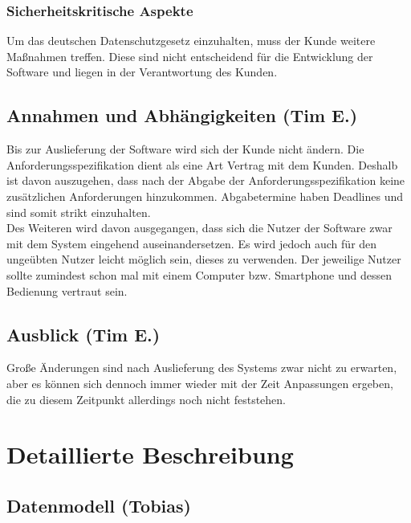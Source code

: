 \documentclass[fontsize=12pt,paper=a4,twoside]{scrartcl}
\begin{document}
\subsubsection{Sicherheitskritische Aspekte} \label{subsubsec:SicherheitsAspekte} Um das deutschen Datenschutzgesetz einzuhalten, muss der Kunde weitere Maßnahmen treffen. Diese sind nicht entscheidend für die Entwicklung der Software und liegen in der Verantwortung des Kunden.

\subsection{Annahmen und Abhängigkeiten (Tim E.)} \label{subsec:Annahmen} Bis zur Auslieferung der Software wird sich der Kunde nicht ändern. Die Anforderungsspezifikation dient als eine Art Vertrag mit dem Kunden. Deshalb ist davon auszugehen, dass nach der Abgabe der Anforderungsspezifikation keine zusätzlichen Anforderungen hinzukommen. Abgabetermine haben Deadlines und sind somit strikt einzuhalten.\\
Des Weiteren wird davon ausgegangen, dass sich die Nutzer der Software zwar mit dem System eingehend auseinandersetzen. Es wird jedoch auch für den ungeübten Nutzer leicht möglich sein, dieses zu verwenden. Der jeweilige Nutzer sollte zumindest schon mal mit einem Computer bzw. Smartphone und dessen Bedienung vertraut sein.\\


\subsection{Ausblick (Tim E.)} \label{subsec:Ausblick} Große Änderungen sind nach Auslieferung des Systems zwar nicht zu erwarten, aber es können sich dennoch immer wieder mit der Zeit Anpassungen ergeben, die zu diesem Zeitpunkt allerdings noch nicht feststehen.

\section{Detaillierte Beschreibung}
\label{ch:DetaillierteBeschreibung}


\subsection{Datenmodell (Tobias)}
\end{document}
